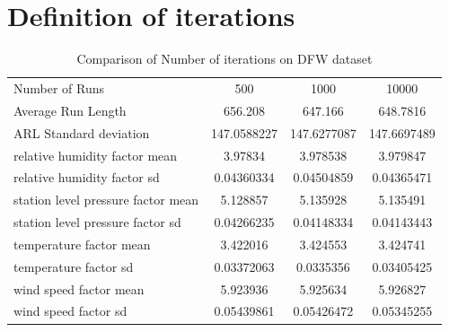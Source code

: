 
\captionsetup{list=no}

\chapter{Definition of iterations}
\begin{table}[!htbp]
\centering
\caption{Comparison of Number of iterations on DFW dataset}
\begin{tabular}{lccc}
\toprule
Number of Runs & 500 & 1000  & 10000 \\
Average Run Length & 656.208 & 647.166 & 648.7816 \\
ARL Standard deviation & 147.0588227 & 147.6277087 & 147.6697489 \\
relative humidity factor mean & 3.97834 & 3.978538 & 3.979847 \\
relative humidity factor sd & 0.04360334 & 0.04504859 & 0.04365471 \\
station level pressure factor mean & 5.128857 & 5.135928 & 5.135491 \\
station level pressure factor sd & 0.04266235 & 0.04148334 & 0.04143443 \\
temperature factor mean & 3.422016 & 3.424553 & 3.424741 \\
temperature factor sd & 0.03372063 & 0.0335356 & 0.03405425 \\
wind speed factor mean & 5.923936 & 5.925634 & 5.926827 \\
wind speed factor sd & 0.05439861 & 0.05426472 & 0.05345255 \\
\bottomrule
\end{tabular}
\end{table}

